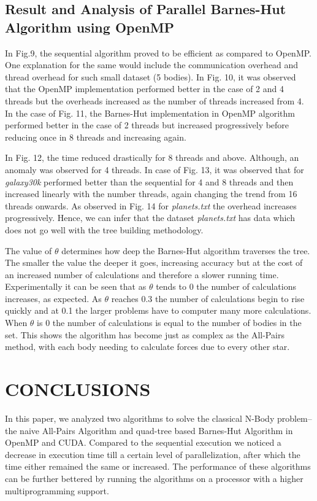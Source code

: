 \documentclass[letterpaper, 10 pt, conference]{ieeeconf}
\begin{document}
\subsection{Result and Analysis of Parallel Barnes-Hut Algorithm using OpenMP}

In Fig.9, the sequential algorithm proved to be efficient as compared to OpenMP. One explanation for the same would include the communication overhead and thread overhead for such small dataset (5 bodies). In Fig. 10, it was observed that the OpenMP implementation performed better in the case of 2 and 4 threads but the overheads increased as the number of threads increased from 4. In the case of Fig. 11, the Barnes-Hut implementation in OpenMP algorithm performed better in the case of 2 threads but increased progressively before reducing once in 8 threads and increasing again. \par

In Fig. 12, the time reduced drastically for 8 threads and above. Although, an anomaly was observed for 4 threads. In case of Fig. 13, it was observed that for \textit{galaxy30k} performed better than the sequential for 4 and 8 threads and then increased linearly with the number threads, again changing the trend from 16 threads onwards. As observed in Fig. 14 for \textit{planets.txt} the overhead increases progressively. Hence, we can infer that the dataset \textit{planets.txt} has data which does not go well with the tree building methodology. \par

The value of $\theta$ determines how deep the Barnes-Hut algorithm traverses the tree. The smaller the value the deeper it goes, increasing accuracy but at the cost of an increased number of calculations and therefore a slower running time. Experimentally it can be seen that as $\theta$ tends to 0 the number of calculations increases, as expected. As $\theta$ reaches 0.3 the number of calculations begin to rise quickly and at 0.1 the larger problems have to computer many more calculations. When $\theta$ is 0 the number of calculations is equal to the number of bodies in the set. This shows the algorithm has become just as complex as the All-Pairs method, with each body needing to calculate forces due to every other star.

\section{CONCLUSIONS}

In this paper, we analyzed two algorithms to solve the classical N-Body problem{--} the naive All-Pairs Algorithm and quad-tree based Barnes-Hut Algorithm in OpenMP and CUDA. Compared to the sequential execution we noticed a decrease in execution time till a certain level of parallelization, after which the time either remained the same or increased. The performance of these algorithms can be further bettered by running the algorithms on a processor with a higher multiprogramming support. \par 
\end{document}
